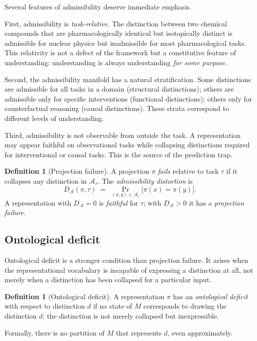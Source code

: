 \documentclass[11pt, a4paper]{article}
\theoremstyle{plain}
\theoremstyle{definition}
\newtheorem{definition}[theorem]{Definition}
\theoremstyle{remark}
\newcommand{\Adm}{\mathcal{A}}
\newcommand{\Proj}{\pi}
\newcommand{\dA}{D_{\!\mathcal{A}}}
\begin{document}
Several features of admissibility deserve immediate emphasis.

First, admissibility is \emph{task-relative}. The distinction between
two chemical compounds that are pharmacologically identical but
isotopically distinct is admissible for nuclear physics but
inadmissible for most pharmacological tasks. This relativity is
not a defect of the framework but a constitutive feature of
understanding: understanding is always understanding \emph{for some
purpose}.

Second, the admissibility manifold has a natural stratification.
Some distinctions are admissible for all tasks in a domain
(structural distinctions); others are admissible only for specific
interventions (functional distinctions); others only for counterfactual
reasoning (causal distinctions). These strata correspond to
different levels of understanding.

Third, admissibility is not observable from outside the task.
A representation may appear faithful on observational tasks while
collapsing distinctions required for interventional or causal tasks.
This is the source of the prediction trap.

\begin{definition}[Projection failure]
\label{def:projfail}
A projection $\Proj$ \emph{fails} relative to task $\tau$ if it
collapses any distinction in $\Adm_\tau$. The \emph{admissibility
distortion} is
\[
  \dA(\Proj, \tau)
  \;=\;
  \Pr_{(x,y) \in \Adm_\tau}\!\bigl[\Proj(x) = \Proj(y)\bigr].
\]
A representation with $\dA = 0$ is \emph{faithful} for $\tau$;
with $\dA > 0$ it has a \emph{projection failure}.
\end{definition}

\subsection{Ontological deficit}

Ontological deficit is a stronger condition than projection failure.
It arises when the representational vocabulary is incapable of
expressing a distinction at all, not merely when a distinction
has been collapsed for a particular input.

\begin{definition}[Ontological deficit]
\label{def:ontdef}
A representation $\Proj$ has an \emph{ontological deficit} with
respect to distinction $d$ if no state of $M$ corresponds to
drawing the distinction $d$: the distinction is not merely
collapsed but inexpressible.

Formally, there is no partition of $M$ that represents $d$,
even approximately.
\end{definition}
\end{document}
